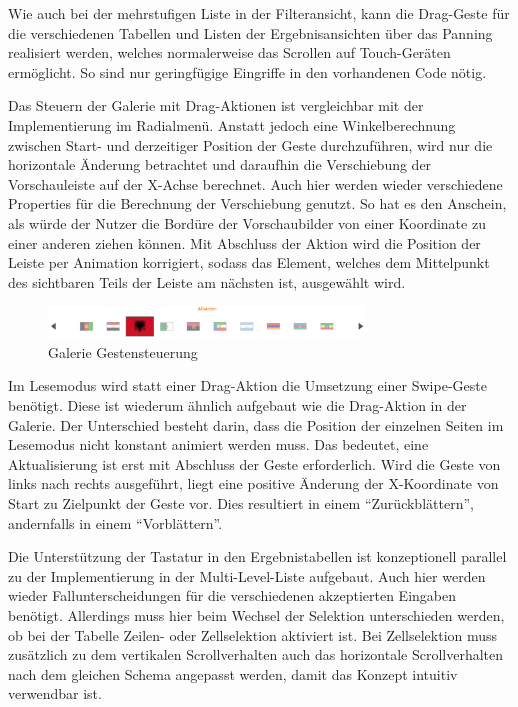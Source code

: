 Wie auch bei der mehrstufigen Liste in der Filteransicht, kann die Drag-Geste für die verschiedenen Tabellen und Listen der Ergebnisansichten über das Panning realisiert werden, welches normalerweise das Scrollen auf Touch-Geräten ermöglicht. So sind nur geringfügige Eingriffe in den vorhandenen Code nötig.\par
Das Steuern der Galerie mit Drag-Aktionen ist vergleichbar mit der Implementierung im Radialmenü. Anstatt jedoch eine Winkelberechnung zwischen Start- und derzeitiger Position der Geste durchzuführen, wird nur die horizontale Änderung betrachtet und daraufhin die Verschiebung der Vorschauleiste auf der X-Achse berechnet. Auch hier werden wieder verschiedene Properties für die Berechnung der Verschiebung genutzt. So hat es den Anschein, als würde der Nutzer die Bordüre der Vorschaubilder von einer Koordinate zu einer anderen ziehen können. Mit Abschluss der Aktion wird die Position der Leiste per Animation korrigiert, sodass das Element, welches dem Mittelpunkt des sichtbaren Teils der Leiste am nächsten ist, ausgewählt wird.\par
\begin{figure}[H]
 \centering
 \includegraphics[width=0.75\textwidth]{grafiken/gallery_drag.png}
 \caption{Galerie Gestensteuerung}
 \label{fig:mllKeyCapture}
\end{figure}
Im Lesemodus wird statt einer Drag-Aktion die Umsetzung einer Swipe-Geste benötigt. Diese ist wiederum ähnlich aufgebaut wie die Drag-Aktion in der Galerie. Der Unterschied besteht darin, dass die Position der einzelnen Seiten im Lesemodus nicht konstant animiert werden muss.  Das bedeutet, eine Aktualisierung ist erst mit Abschluss der Geste erforderlich. Wird die Geste von links nach rechts ausgeführt, liegt eine positive Änderung der X-Koordinate von Start zu Zielpunkt der Geste vor. Dies resultiert in einem \enquote{Zurückblättern}, andernfalls in einem \enquote{Vorblättern}.\par
Die Unterstützung der Tastatur in den Ergebnistabellen ist konzeptionell parallel zu der Implementierung in der Multi-Level-Liste aufgebaut. Auch hier werden wieder Fallunterscheidungen für die verschiedenen akzeptierten Eingaben benötigt. Allerdings muss hier beim Wechsel der Selektion unterschieden werden, ob bei der Tabelle Zeilen- oder Zellselektion aktiviert ist. Bei Zellselektion muss zusätzlich zu dem vertikalen Scrollverhalten auch das horizontale Scrollverhalten nach dem gleichen Schema angepasst werden, damit das Konzept intuitiv verwendbar ist.\par
